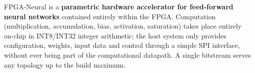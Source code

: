 \thispagestyle{plain}
\noindent
{}

\vspace{6pt}
\noindent
{\small FPGA-Neural is a \textbf{parametric hardware accelerator for feed-forward
neural networks} contained entirely within the FPGA. Computation (multiplication,
accumulation, bias, activation, saturation) takes place entirely on-chip in INT8/INT32
integer arithmetic; the host system only provides configuration, weights, input data
and control through a simple SPI interface, without ever being part of the
computational datapath. A single bitstream serves any topology up to the build
maximum.}

